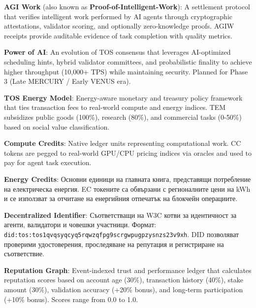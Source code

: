 \documentclass[11pt]{article}
\begin{document}
\begin{description}[leftmargin=3cm, style=nextline]
  \item[AGIW (PoIW)] \textbf{AGI Work} (also known as \textbf{Proof-of-Intelligent-Work}): A settlement protocol that verifies intelligent work performed by AI agents through cryptographic attestations, validator scoring, and optionally zero-knowledge proofs. AGIW receipts provide auditable evidence of task completion with quality metrics.

  \item[PAI] \textbf{Power of AI}: An evolution of TOS consensus that leverages AI-optimized scheduling hints, hybrid validator committees, and probabilistic finality to achieve higher throughput (10,000+ TPS) while maintaining security. Planned for Phase 3 (Late MERCURY / Early VENUS era).

  \item[TEM] \textbf{TOS Energy Model}: Energy-aware monetary and treasury policy framework that ties transaction fees to real-world compute and energy indices. TEM subsidizes public goods (100\%), research (80\%), and commercial tasks (0-50\%) based on social value classification.

  \item[CC] \textbf{Compute Credits}: Native ledger units representing computational work. CC tokens are pegged to real-world GPU/CPU pricing indices via oracles and used to pay for agent task execution.

  \item[EC] \textbf{Energy Credits}: Основни единици на главната книга, представящи потребление на електрическа енергия. EC токените са обвързани с регионалните цени на kWh и се използват за отчитане на енергийния отпечатък на блокчейн операциите.

  \item[DID] \textbf{Decentralized Identifier}: Съответстващи на W3C котви за идентичност за агенти, валидатори и човешки участници. Формат: \texttt{did:tos:tos1qvqsyqcyq5rqwzqfpg9scrgwpugpzysnzs23v9xh}. DID позволяват проверими удостоверения, проследяване на репутация и регистриране на съответствие.

  \item[RepGraph] \textbf{Reputation Graph}: Event-indexed trust and performance ledger that calculates reputation scores based on account age (30\%), transaction history (40\%), stake amount (30\%), validation accuracy (+20\% bonus), and long-term participation (+10\% bonus). Scores range from 0.0 to 1.0.


\end{description}
\end{document}
